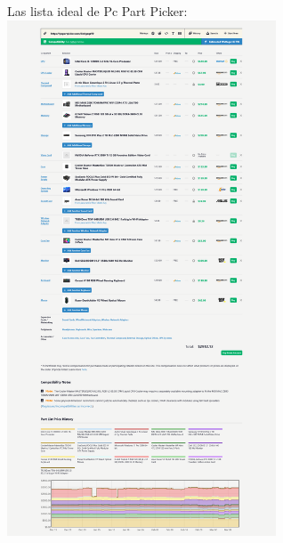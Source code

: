 \documentclass[12pt, a4paper]{article}
\begin{document}
Las lista ideal de Pc Part Picker: \\ 
\includegraphics[width=0.6\textwidth]{Ideal.png} \\
\end{document}
